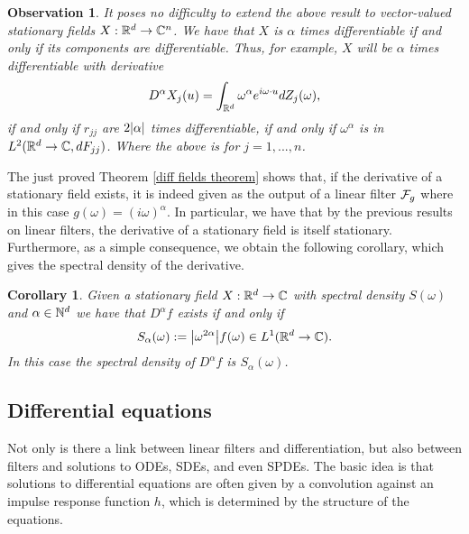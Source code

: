 \documentclass[12pt]{article}
\newtheorem{observation}{Observation}
\newtheorem{corollary}{Corollary}
\begin{document}
\begin{observation}
	It poses no difficulty to extend the above result to vector-valued stationary fields $X:{\mathbb R}^d\to\mathbb{C}^n$.
	We have that $X$ is $\alpha$ times differentiable
	if and only if its components are differentiable. Thus, for example, $X$ will be $\alpha$ times differentiable with derivative
	\begin{equation*}
		D^\alpha X_j(u)=\int_{{\mathbb R}^d}\omega^{\alpha}e^{i\omega\cdot u}dZ_j(\omega),
	\end{equation*}
	if and only if $r_{jj}$ are $2\abs{\alpha}$ times differentiable, if and only if $\omega^\alpha$ is in\\ $L^2({\mathbb R}^d\to\mathbb{C}, dF_{jj})$. Where the above is for $j=1,...,n$.
\end{observation}
The just proved Theorem \ref{diff fields theorem} shows that, if the derivative of a stationary field exists, it is indeed given as the output of a linear filter $\mathcal{F}_g$ where in this case $g(\omega)=(i\omega)^\alpha$. In particular, we have that by the previous results on linear filters, the derivative of a stationary field is itself stationary. Furthermore, as a simple consequence, we obtain the following corollary,
which gives the spectral density of the derivative.
\begin{corollary}\label{density of derivative}
	Given a stationary field $X:{\mathbb R}^d\to\mathbb{C}$ with spectral density $S(\omega)$
	and $\alpha\in \mathbb{N}^d$ we have that $D^\alpha f$ exists if and only if $$S_\alpha(\omega):=\abs{\omega^{2\alpha}} f(\omega)\in L^1({\mathbb R}^d\to\mathbb{C}).$$ In this case the spectral density of $D^\alpha f$ is $S_\alpha(\omega)$.
\end{corollary}
\subsection{Differential equations}\label{differential equations section}
Not only is there a link between linear filters and differentiation, but also between filters and solutions to ODEs, SDEs, and even SPDEs. The basic idea is that solutions to differential equations are often given by a convolution against an impulse response function $h$, which is determined by the structure of the equations.
\end{document}
